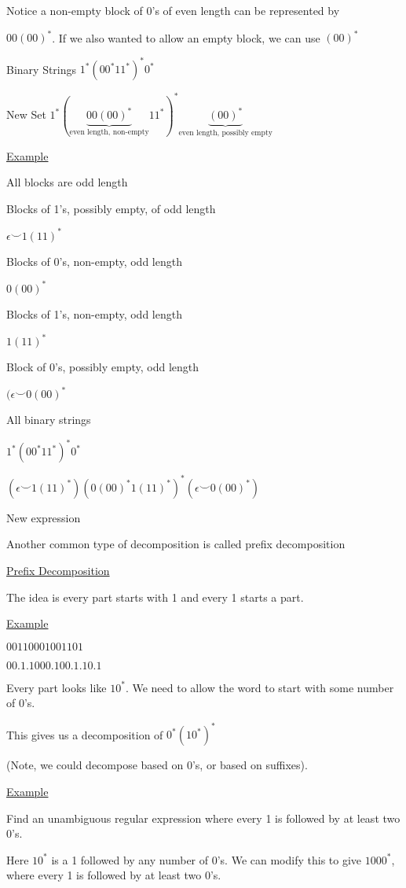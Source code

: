 \documentclass{article}
\begin{document}
Notice a non-empty block of $0$'s of even length can be represented by 

$00(00)^*$. If we also wanted to allow an empty block, we can use $(00)^*$

Binary Strings $1^*(00^*11^*)^*0^*$

New Set $1^*(\underbrace{00(00)^*}_{\text{even length, non-empty}}11^*)^*\underbrace{(00)^*}_{\text{even length, possibly empty}}$

\underline{Example}

All blocks are odd length

Blocks of 1's, possibly empty, of odd length

$\epsilon \smile 1(11)^*$

Blocks of 0's, non-empty, odd length

$0(00)^*$

Blocks of 1's, non-empty, odd length

$1(11)^*$

Block of 0's, possibly empty, odd length

$(\epsilon \smile 0(00)^*$

All binary strings

$1^*(00^*11^*)^*0^*$

$(\epsilon \smile 1(11)^*)(0(00)^*1(11)^*)^*(\epsilon \smile 0(00)^*)$

New expression

Another common type of decomposition is called prefix decomposition

\underline{Prefix Decomposition}


The idea is every part starts with 1 and every 1 starts a part.

\underline{Example}

$00110001001101$

$00.1.1000.100.1.10.1$

Every part looks like $10^*$. We need to allow the word to start with some number of 0's. 

This gives us a decomposition of $0^*(10^*)^*$

(Note, we could decompose based on 0's, or based on suffixes). 

\underline{Example}

Find an unambiguous regular expression where every 1 is followed by at least two 0's. 

Here $10^*$ is a 1 followed by any number of 0's. We can modify this to give $1000^*$, where every 1 is followed by at least two 0's. 
\end{document}
